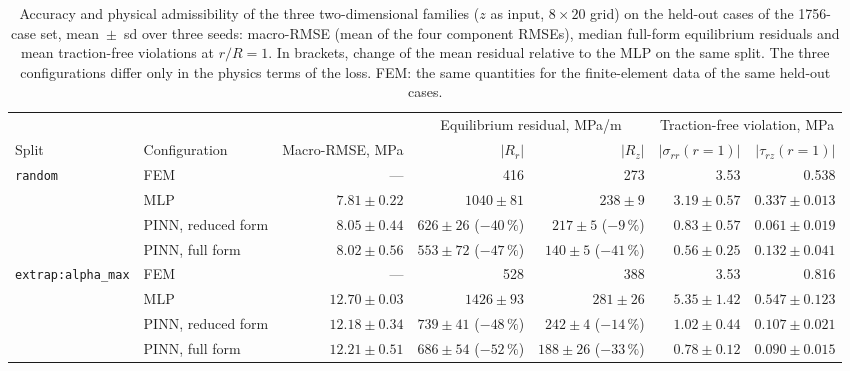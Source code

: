 \documentclass[subscriptcorrection,upint,varvw,barcolor=Goldenrod3,mathalfa=cal=euler,balance,hyphenate,french,pdf-a]{asmejour} %
\begin{document}
\begin{table}[t]
\caption[Accuracy and physical admissibility of the two-dimensional families]{Accuracy and physical admissibility of the three two-dimensional families ($z$ as input, $8\times20$ grid) on the held-out cases of the 1756-case set, mean~$\pm$~sd over three seeds: macro-RMSE (mean of the four component RMSEs), median full-form equilibrium residuals and mean traction-free violations at $r/R=1$. In brackets, change of the mean residual relative to the MLP on the same split. The three configurations differ only in the physics terms of the loss. FEM: the same quantities for the finite-element data of the same held-out cases.}
\label{tab:admissibility}
\centering\small
\setlength{\tabcolsep}{4pt}
\begin{tabular}{@{}llrrrrr@{}}
\toprule
 & & & \multicolumn{2}{c}{Equilibrium residual, MPa/m} & \multicolumn{2}{c}{Traction-free violation, MPa} \\
\cmidrule(lr){4-5}\cmidrule(lr){6-7}
Split & Configuration & Macro-RMSE, MPa & $|R_r|$ & $|R_z|$ & $|\sigma_{rr}(r{=}1)|$ & $|\tau_{rz}(r{=}1)|$ \\
\midrule
\texttt{random} & FEM                & ---           & 416 & 273 & 3.53 & 0.538 \\
                & MLP                & $7.81\pm0.22$ & $1040\pm81$ & $238\pm9$ & $3.19\pm0.57$ & $0.337\pm0.013$ \\
                & PINN, reduced form & $8.05\pm0.44$ & $626\pm26$ ($-40\,\%$) & $217\pm5$ ($-9\,\%$) & $0.83\pm0.57$ & $0.061\pm0.019$ \\
                & PINN, full form    & $8.02\pm0.56$ & $553\pm72$ ($-47\,\%$) & $140\pm5$ ($-41\,\%$) & $0.56\pm0.25$ & $0.132\pm0.041$ \\
\addlinespace
\texttt{extrap:alpha\_max} & FEM                & ---            & 528 & 388 & 3.53 & 0.816 \\
                           & MLP                & $12.70\pm0.03$ & $1426\pm93$ & $281\pm26$ & $5.35\pm1.42$ & $0.547\pm0.123$ \\
                           & PINN, reduced form & $12.18\pm0.34$ & $739\pm41$ ($-48\,\%$) & $242\pm4$ ($-14\,\%$) & $1.02\pm0.44$ & $0.107\pm0.021$ \\
                           & PINN, full form    & $12.21\pm0.51$ & $686\pm54$ ($-52\,\%$) & $188\pm26$ ($-33\,\%$) & $0.78\pm0.12$ & $0.090\pm0.015$ \\
\bottomrule
\end{tabular}
\end{table}
\end{document}
